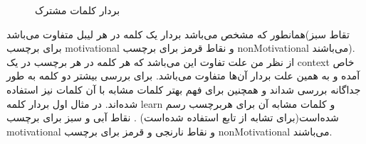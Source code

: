 \documentclass[a4paper]{article}
\begin{document}
\begin{figure}[h!]
\caption{بردار کلمات مشترک}
\label{f1}
\end{figure}
\vspace{10mm}
همانطور که مشخص می‌باشد بردار یک کلمه در هر لیبل متفاوت می‌باشد(تقاط سبز برای برچسب motivational و نقاط قرمز برای برچسب nonMotivational می‌باشند). از نظر من علت تفاوت این می‌باشد که هر کلمه در هر برچسب در یک context خاص آمده و به همین علت بردار آن‌ها متفاوت می‌باشد. برای بررسی بیشتر دو کلمه به طور جداگانه بررسی شداند و همچنین برای فهم بهتر کلمات مشابه با آن کلمات نیز استفاده شده‌اند.
\newline
در مثال اول بردار کلمه learn و کلمات مشابه آن برای هربرچسب رسم شده‌است(برای تشابه از تابع  استفاده شده‌است) . نقاط آبی و سبز برای برچسب motivational و نقاط نارنجی و قرمز برای برچسب nonMotivational می‌باشند.
\newline
\end{document}
